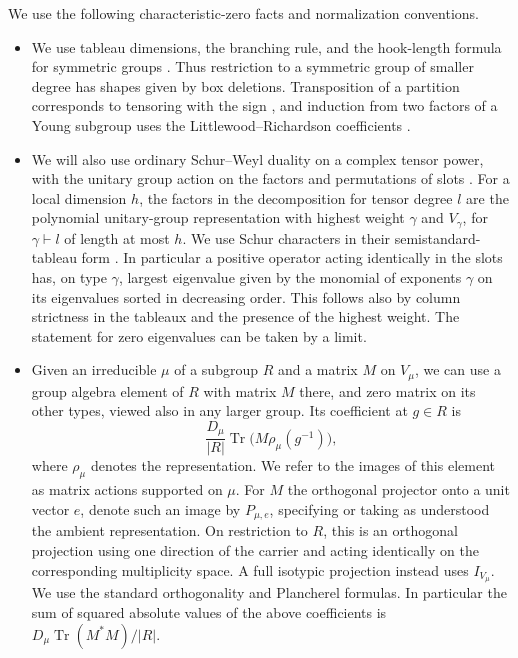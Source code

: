 We use the following characteristic-zero facts and normalization conventions.
\begin{itemize}
\item We use tableau dimensions, the branching rule, and the hook-length formula for symmetric groups \cite[Theorems~2.6.5, 2.8.3, and~3.10.2]{Sagan2001}. Thus restriction to a symmetric group of smaller degree has shapes given by box deletions. Transposition of a partition corresponds to tensoring with the sign \cite[Theorem~6.7]{James1978}, and induction from two factors of a Young subgroup uses the Littlewood--Richardson coefficients \cite[Theorem~16.4]{James1978}.
\item We will also use ordinary Schur--Weyl duality on a complex tensor power, with the unitary group action on the factors and permutations of slots \cite[Theorem~4.57 and Corollary~4.59]{etingof}. For a local dimension \(h\), the factors in the decomposition for tensor degree \(l\) are the polynomial unitary-group representation with highest weight \(\gamma\) and \(V_\gamma\), for \(\gamma\vdash l\) of length at most \(h\). We use Schur characters in their semistandard-tableau form \cite[Definition~7.10.1]{Stanley1999}. In particular a positive operator acting identically in the slots has, on type \(\gamma\), largest eigenvalue given by the monomial of exponents \(\gamma\) on its eigenvalues sorted in decreasing order. This follows also by column strictness in the tableaux and the presence of the highest weight. The statement for zero eigenvalues can be taken by a limit.
\item Given an irreducible \(\mu\) of a subgroup \(R\) and a matrix \(M\) on \(V_\mu\), we can use a group algebra element of \(R\) with matrix \(M\) there, and zero matrix on its other types, viewed also in any larger group. Its coefficient at \(g\in R\) is
\[
 \frac{D_\mu}{|R|}\operatorname{Tr}\big(M \rho_\mu(g^{-1})\big),
\]
where \(\rho_\mu\) denotes the representation. We refer to the images of this element as matrix actions supported on \(\mu\). For \(M\) the orthogonal projector onto a unit vector \(e\), denote such an image by \(P_{\mu,e}\), specifying or taking as understood the ambient representation. On restriction to \(R\), this is an orthogonal projection using one direction of the carrier and acting identically on the corresponding multiplicity space. A full isotypic projection instead uses \(I_{V_\mu}\). We use the standard orthogonality and Plancherel formulas. In particular the sum of squared absolute values of the above coefficients is \(D_\mu\operatorname{Tr}(M^*M)/|R|\).
\end{itemize}

